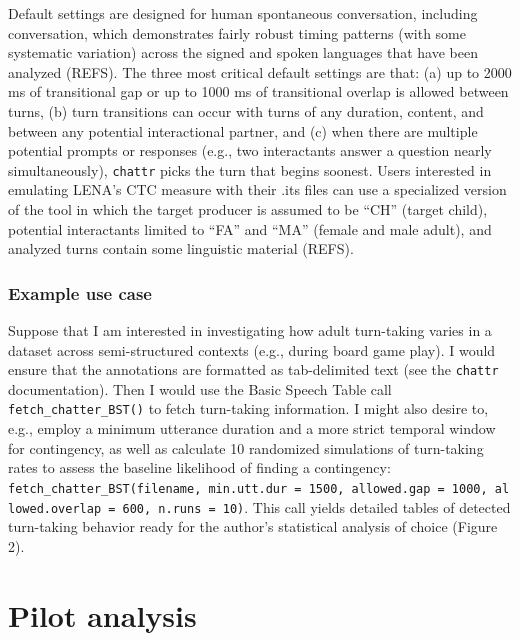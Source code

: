 \documentclass[10pt, letterpaper]{article}
\begin{document}
Default settings are designed for human spontaneous conversation,
including conversation, which demonstrates fairly robust timing patterns
(with some systematic variation) across the signed and spoken languages
that have been analyzed (REFS). The three most critical default settings
are that: (a) up to 2000 ms of transitional gap or up to 1000 ms of
transitional overlap is allowed between turns, (b) turn transitions can
occur with turns of any duration, content, and between any potential
interactional partner, and (c) when there are multiple potential prompts
or responses (e.g., two interactants answer a question nearly
simultaneously), \texttt{chattr} picks the turn that begins soonest.
Users interested in emulating LENA's CTC measure with their .its files
can use a specialized version of the tool in which the target producer
is assumed to be ``CH'' (target child), potential interactants limited
to ``FA'' and ``MA'' (female and male adult), and analyzed turns contain
some linguistic material (REFS).

\hypertarget{example-use-case}{%
\subsubsection{Example use case}\label{example-use-case}}

Suppose that I am interested in investigating how adult turn-taking
varies in a dataset across semi-structured contexts (e.g., during board
game play). I would ensure that the annotations are formatted as
tab-delimited text (see the \texttt{chattr} documentation). Then I would
use the Basic Speech Table call \texttt{fetch\_chatter\_BST()} to fetch
turn-taking information. I might also desire to, e.g., employ a minimum
utterance duration and a more strict temporal window for contingency, as
well as calculate 10 randomized simulations of turn-taking rates to
assess the baseline likelihood of finding a contingency:
\texttt{fetch\_chatter\_BST(filename,\ min.utt.dur\ =\ 1500,\ allowed.gap\ =\ 1000,\ allowed.overlap\ =\ 600,\ n.runs\ =\ 10)}.
This call yields detailed tables of detected turn-taking behavior ready
for the author's statistical analysis of choice (Figure 2).

\hypertarget{pilot-analysis}{%
\section{Pilot analysis}\label{pilot-analysis}}
\end{document}
